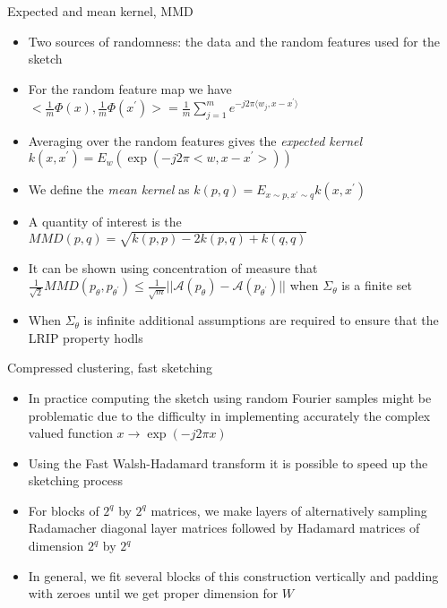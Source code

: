 \begin{frame}{Expected and mean kernel, MMD}
\begin{itemize}
    \item Two sources of randomness: the data and the random features used for the sketch
    \item For the random feature map we have $<\frac{1}{m}\Phi(x),\frac{1}{m}\Phi(x^{'})>=\frac{1}{m}\sum_{j=1}^m e^{-j2\pi \langle w_j,x-x^{'} \rangle}$
    \item Averaging over the random features gives the \emph{expected kernel} $k(x,x^{'})=E_w(\exp(-j2\pi<w,x-x^{'}>))$
    \item We define the \emph{mean kernel} as
    $k(p,q)=E_{x\sim p, x^{'}\sim q} k(x,x^{'})$
    \item A quantity of interest is the   $MMD(p,q)=\sqrt{k(p,p)-2k(p,q)+k(q,q)}$
    \item It can be shown using concentration of measure that
     $\frac{1}{\sqrt{2}}MMD(p_{\theta},p_{\theta^{'}})\leq \frac{1}{\sqrt{m}}||\mathcal{A}(p_{\theta})-\mathcal{A}(p_{\theta^{'}})||$ when $\Sigma_{\theta}$ is a finite set
     \item When $\Sigma_{\theta}$ is infinite additional assumptions are required to ensure that the LRIP property hodls
\end{itemize}

\end{frame}

\begin{frame}{Compressed clustering, fast sketching}
\begin{itemize}
    \item In practice computing the sketch using random Fourier samples might be problematic due to the difficulty in implementing accurately the complex valued function $x\rightarrow\exp(-j2\pi x)$
    \item Using the Fast Walsh-Hadamard transform it is possible to speed up the sketching process
    \item For blocks of $2^q$ by $2^q$ matrices, we make layers of alternatively sampling Radamacher diagonal layer matrices
    followed by Hadamard matrices of dimension $2^q$ by $2^q$
    \item In general, we fit several blocks of this construction vertically and padding with zeroes until we get proper dimension for $W$
\end{itemize}

\end{frame}




